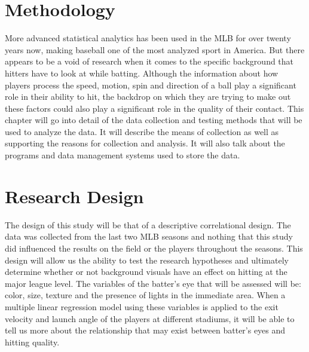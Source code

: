 \documentclass{article}
\begin{document}
\begin{doublespace}
\section{Methodology}
More advanced statistical analytics has been used in the MLB for over twenty years now, making baseball one of the most analyzed sport in America. But there appears to be a void of research when it comes to the specific background that hitters have to look at while batting. Although the information about how players process the speed, motion, spin and direction of a ball play a significant role in their ability to hit, the backdrop on which they are trying to make out these factors could also play a significant role in the quality of their contact. This chapter will go into detail of the data collection and testing methods that will be used to analyze the data. It will describe the means of collection as well as supporting the reasons for collection and analysis. It will also talk about the programs and data management systems used to store the data.

\section{Research Design}
The design of this study will be that of a descriptive correlational design. The data was collected from the last two MLB seasons and nothing that this study did influenced the results on the field or the players throughout the seasons. This design will allow us the ability to test the research hypotheses and ultimately determine whether or not background visuals have an effect on hitting at the major league level. The variables of the batter’s eye that will be assessed will be: color, size, texture and the presence of lights in the immediate area. When a multiple linear regression model using these variables is applied to the exit velocity and launch angle of the players at different stadiums, it will be able to tell us more about the relationship that may exist between batter’s eyes and hitting quality.


\end{doublespace}
\end{document}
